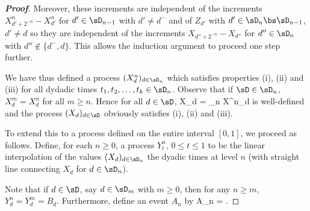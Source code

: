 \begin{proof}[\bf Proof]
Moreover, these increments are independent of the increments $X^n_{d'+2^{-n}} - X^n_{d'}$ for $d' \in \sD_{n-1}$ with $d' \neq d^-$ and of $Z_{d'}$ with $d'\in\sD_n\bs \sD_{n-1}$, $d' \neq d$ so they are independent of the increments $X_{d''+2^{-n}} - X_{d''}$ for $d'' \in \sD_n$ with $d'' \notin \{d^-, d\}$. This allows the induction argument to proceed one step further.

We have thus defined a process $(X^n_d)_{d \in \sD_n}$ which satisfies properties (i), (ii) and (iii) for all dydadic times $t_1, t_2,\dots, t_k \in \sD_n$. Observe that if $\sD \in \sD_n$, $X^m_d = X^n_d$ for all $m \geq n$. Hence for all $d \in \sD$,
\be
X_d = \lim_{n\to \infty} X^n_d
\ee
is well-defined and the process $(X_d)_{d \in \sD}$ obviously satisfies (i), (ii) and (iii).


To extend this to a process defined on the entire interval $[0, 1]$, we proceed as follows. Define, for each $n \geq 0$, a process $Y^n_t$, $0 \leq t \leq 1$ to be the linear interpolation of the values $(X_d)_{d \in\sD_n}$ the dyadic times at level $n$ (with straight line connecting $X_d$ for $d\in \sD_n$).



Note that if $d \in \sD$, say $d \in \sD_m$ with $m \geq 0$, then for any $n \geq m$, $Y^n_d = Y^m_d = B_d$. Furthermore, define an event $A_n$ by
\be
A_n = .
\ee


\end{proof}
